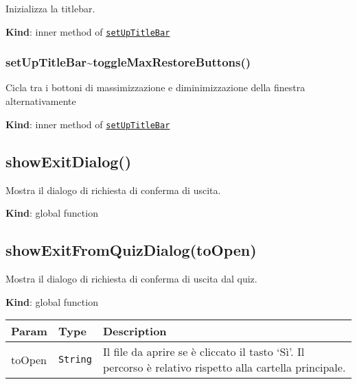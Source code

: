 Inizializza la titlebar.

\textbf{Kind}: inner method of
\protect\hyperlink{setUpTitleBar}{\texttt{setUpTitleBar}}\\
\protect\hypertarget{setUpTitleBar..toggleMaxRestoreButtons}{}{}

\hypertarget{setuptitlebartogglemaxrestorebuttons}{%
\subsubsection{setUpTitleBar\textasciitilde toggleMaxRestoreButtons()}\label{setuptitlebartogglemaxrestorebuttons}}

Cicla tra i bottoni di massimizzazione e diminimizzazione della finestra
alternativamente

\textbf{Kind}: inner method of
\protect\hyperlink{setUpTitleBar}{\texttt{setUpTitleBar}}\\
\protect\hypertarget{showExitDialog}{}{}

\hypertarget{showexitdialog}{%
\subsection{showExitDialog()}\label{showexitdialog}}

Mostra il dialogo di richiesta di conferma di uscita.

\textbf{Kind}: global function\\
\protect\hypertarget{showExitFromQuizDialog}{}{}

\hypertarget{showexitfromquizdialogtoopen}{%
\subsection{showExitFromQuizDialog(toOpen)}\label{showexitfromquizdialogtoopen}}

Mostra il dialogo di richiesta di conferma di uscita dal quiz.

\textbf{Kind}: global function

\begin{tabularx}{\textwidth}{XXX}
\toprule
\begin{minipage}[b]{0.30\columnwidth}\raggedright
Param\strut
\end{minipage} & \begin{minipage}[b]{0.30\columnwidth}\raggedright
Type\strut
\end{minipage} & \begin{minipage}[b]{0.30\columnwidth}\raggedright
Description\strut
\end{minipage}\tabularnewline
\midrule
\endhead
\begin{minipage}[t]{0.30\columnwidth}\raggedright
toOpen\strut
\end{minipage} & \begin{minipage}[t]{0.30\columnwidth}\raggedright
\texttt{String}\strut
\end{minipage} & \begin{minipage}[t]{0.30\columnwidth}\raggedright
Il file da aprire se è cliccato il tasto `Sì'. Il percorso è relativo
rispetto alla cartella principale.\strut
\end{minipage}\tabularnewline
\bottomrule
\end{tabularx}

